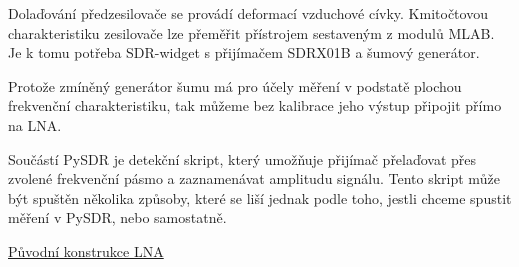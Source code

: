 \documentclass[12pt,a4paper,oneside]{article}
\begin{document}
Dolaďování předzesilovače se provádí deformací vzduchové cívky. Kmitočtovou charakteristiku zesilovače lze přeměřit přístrojem sestaveným z modulů MLAB. Je k tomu potřeba SDR-widget s přijímačem SDRX01B a šumový generátor.

Protože zmíněný generátor šumu má pro účely měření v podstatě plochou frekvenční charakteristiku, tak můžeme bez kalibrace jeho výstup připojit přímo na LNA.

Součástí PySDR je detekční skript, který umožňuje přijímač přelaďovat přes zvolené frekvenční pásmo a zaznamenávat amplitudu signálu. Tento skript může být spuštěn několika způsoby, které se liší jednak podle toho, jestli chceme spustit měření v PySDR, nebo samostatně.


\begin{thebibliography}{99}
\href{http://}{Původní konstrukce LNA}

\end{thebibliography}
\end{document}
